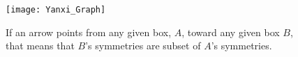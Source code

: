 \begin{figure}[!ht]
\centering
\texttt{[image: Yanxi\_Graph]}
\caption{If an arrow points from any given box, $A$, toward any given box $B$, that means that $B$'s symmetries are subset of $A$'s symmetries.}
\label{graph}
\end{figure}